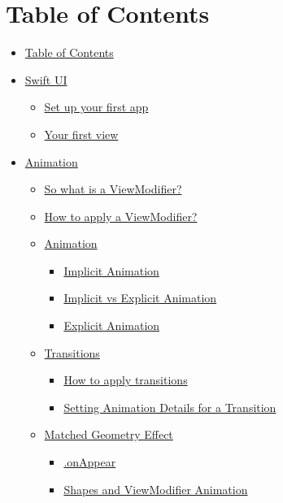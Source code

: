 \documentclass[]{article}
\date{}
\providecommand{\tightlist}{%
  \setlength{\itemsep}{0pt}\setlength{\parskip}{0pt}}
\begin{document}
\hypertarget{table-of-contents}{%
\section{Table of Contents}\label{table-of-contents}}

\begin{itemize}
\tightlist
\item
  \protect\hyperlink{table-of-contents}{Table of Contents}
\item
  \protect\hyperlink{swift-ui}{Swift UI}

  \begin{itemize}
  \tightlist
  \item
    \protect\hyperlink{set-up-your-first-app}{Set up your first app}
  \item
    \protect\hyperlink{your-first-view}{Your first view}
  \end{itemize}
\item
  \protect\hyperlink{animation}{Animation}

  \begin{itemize}
  \tightlist
  \item
    \protect\hyperlink{so-what-is-a-viewmodifier}{So what is a
    ViewModifier?}
  \item
    \protect\hyperlink{how-to-apply-a-viewmodifier}{How to apply a
    ViewModifier?}
  \item
    \protect\hyperlink{animation-1}{Animation}

    \begin{itemize}
    \tightlist
    \item
      \protect\hyperlink{implicit-animation}{Implicit Animation}
    \item
      \protect\hyperlink{implicit-vs-explicit-animation}{Implicit vs
      Explicit Animation}
    \item
      \protect\hyperlink{explicit-animation}{Explicit Animation}
    \end{itemize}
  \item
    \protect\hyperlink{transitions}{Transitions}

    \begin{itemize}
    \tightlist
    \item
      \protect\hyperlink{how-to-apply-transitions}{How to apply
      transitions}
    \item
      \protect\hyperlink{setting-animation-details-for-a-transition}{Setting
      Animation Details for a Transition}
    \end{itemize}
  \item
    \protect\hyperlink{matched-geometry-effect}{Matched Geometry Effect}

    \begin{itemize}
    \tightlist
    \item
      \protect\hyperlink{onappear}{.onAppear}
    \item
      \protect\hyperlink{shapes-and-viewmodifier-animation}{Shapes and
      ViewModifier Animation}
    \end{itemize}
  \end{itemize}
\end{itemize}
\end{document}
